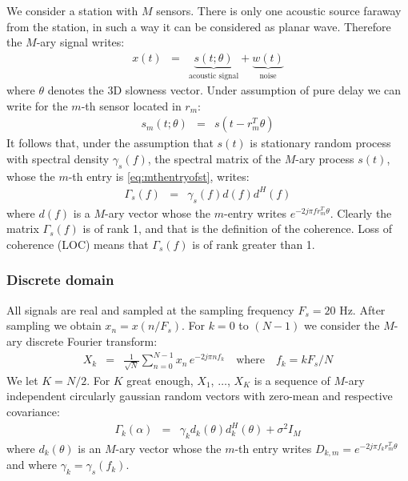 \documentclass[a4paper, 12pt]{report}
\newcommand{\diag}[1]{\mathrm{diag}\left( #1 \right)}
\begin{document}
We consider a station with $M$ sensors. There is only one acoustic source faraway from the station, in such a way it can be considered as planar wave. Therefore the $M$-ary signal  writes: 
\begin{eqnarray*}
x(t) & = & \underbrace{s(t;\theta)}_{\text{acoustic signal}}+ \underbrace{w(t)}_{\text{noise}}
\end{eqnarray*}
where $\theta$ denotes the 3D slowness vector. Under assumption of pure delay we can write for the $m$-th sensor located in $r_{m}$:
\begin{eqnarray}
\label{eq:mthentryofst}
s_{m}(t;\theta)&=&s(t-r_{m}^{T}\theta)
\end{eqnarray}
It follows  that, under the assumption  that $s(t)$ is stationary random process with spectral density $\gamma_{s}(f)$, the spectral matrix of the $M$-ary process $s(t)$, whose the $m$-th entry is \eqref{eq:mthentryofst}, writes:
\begin{eqnarray*}
\Gamma_{s}(f)&=&\gamma_{s}(f)d(f)d^{H}(f)
\end{eqnarray*}
where $d(f)$ is a $M$-ary vector whose the $m$-entry writes $e^{-2j\pi fr_{m}^{T}\theta}$. Clearly the matrix $\Gamma_{s}(f)$ is of rank 1, and that is the definition of the coherence. Loss of coherence (LOC) means that $\Gamma_{s}(f)$ is of rank greater than 1.


\subsubsection{Discrete domain}

All signals are real and sampled at the sampling frequency  $F_{s}=20$ Hz. After sampling we obtain $x_{n}=x(n/F_{s})$. For $k=0$ to $(N-1)$ we consider the $M$-ary discrete Fourier transform:
 \begin{eqnarray*}
 X_{k}&=&\frac{1}{\sqrt{N}}\sum_{n=0}^{N-1}x_{n}\,e^{-2j\pi n f_{k}}
    \quad\mathrm{where}\quad
 f_{k}=kF_{s}/N
 \end{eqnarray*}
We let $K=N/2$.
For $K$ great enough, $X_{1}$, $\ldots$, $X_{K}$ is a sequence of  $M$-ary independent circularly gaussian random vectors with zero-mean and respective covariance:
\begin{eqnarray}
\label{eq:spectralmatrixpuredelay}
\Gamma_{k}(\alpha)&=&\gamma_{k}d_{k}(\theta)d_{k}^{H}(\theta)+\sigma^{2}I_{M}
\end{eqnarray}
where $d_{k}(\theta)$ is an $M$-ary vector whose the $m$-th entry writes $D_{k,m}=e^{-2j\pi f_{k} r_{m}^{T}\theta }$ and where $\gamma_{k}=\gamma_{s}(f_{k})$.
\end{document}

